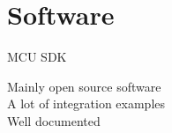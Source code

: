 \documentclass[compress,red]{beamer}
\begin{document}

\section{Software}

\begin{frame}{MCU SDK}
  \Large
  \begin{center}
    Mainly open source software \\
    \vskip 1cm
    A lot of integration examples \\
    \vskip 1cm
    Well documented \\
  \end{center}

\end{frame}
\end{document}
